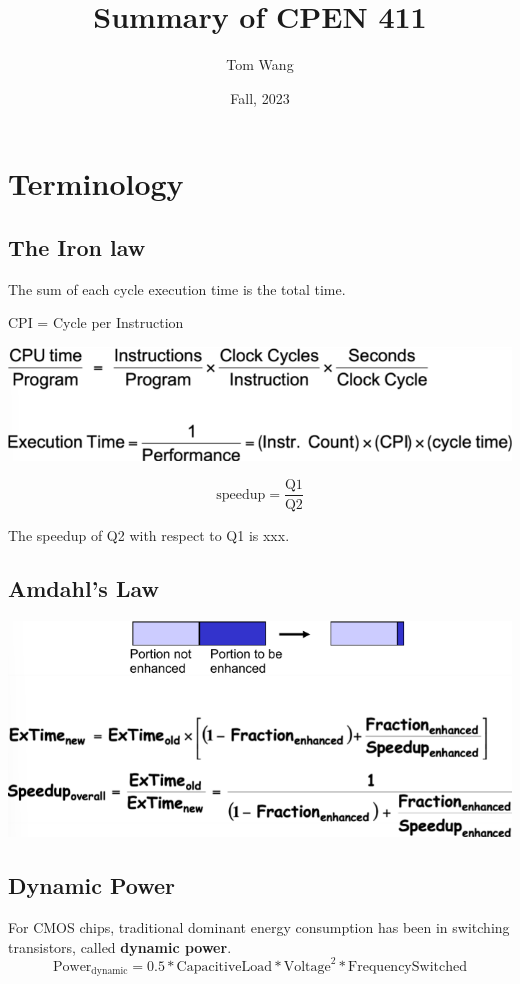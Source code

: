 \documentclass[letterpaper,12pt]{article}
\title{Summary of CPEN 411}
\author{Tom Wang}
\date{Fall, 2023}
\begin{document}
\maketitle
\thispagestyle{plain}

\section{Terminology}
\subsection{The Iron law}
The sum of each cycle execution time is the total time.

CPI = Cycle per Instruction

\includegraphics*{./Image/The Iron law.png}

\[
    \text{speedup}=\frac{\text{Q1}}{\text{Q2}}
\]

The speedup of Q2 with respect to Q1 is xxx.

\subsection{Amdahl's Law}

\includegraphics*{./Image/Amdahl's Law.png}

\subsection{Dynamic Power}

For CMOS chips, traditional dominant energy consumption has been in switching transistors, called \textbf{dynamic power}.
\[
    \text{Power}_{\text{dynamic}}=0.5*\text{CapacitiveLoad}*\text{Voltage}^2*\text{FrequencySwitched}
\]
\end{document}
